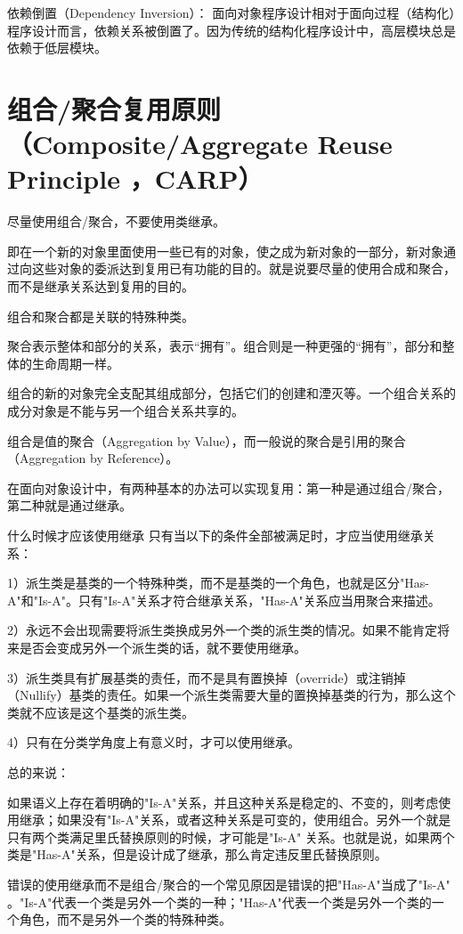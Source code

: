 依赖倒置（Dependency Inversion）：
面向对象程序设计相对于面向过程（结构化）程序设计而言，依赖关系被倒置了。因为传统的结构化程序设计中，高层模块总是依赖于低层模块。

\section{组合/聚合复用原则（Composite/Aggregate Reuse Principle ，CARP）}
尽量使用组合/聚合，不要使用类继承。

即在一个新的对象里面使用一些已有的对象，使之成为新对象的一部分，新对象通过向这些对象的委派达到复用已有功能的目的。就是说要尽量的使用合成和聚合，而不是继承关系达到复用的目的。

组合和聚合都是关联的特殊种类。

聚合表示整体和部分的关系，表示“拥有”。组合则是一种更强的“拥有”，部分和整体的生命周期一样。

组合的新的对象完全支配其组成部分，包括它们的创建和湮灭等。一个组合关系的成分对象是不能与另一个组合关系共享的。

组合是值的聚合（Aggregation by Value），而一般说的聚合是引用的聚合（Aggregation by Reference）。

在面向对象设计中，有两种基本的办法可以实现复用：第一种是通过组合/聚合，第二种就是通过继承。

什么时候才应该使用继承
只有当以下的条件全部被满足时，才应当使用继承关系：

1）派生类是基类的一个特殊种类，而不是基类的一个角色，也就是区分"Has-A"和"Is-A"。只有"Is-A"关系才符合继承关系，"Has-A"关系应当用聚合来描述。

2）永远不会出现需要将派生类换成另外一个类的派生类的情况。如果不能肯定将来是否会变成另外一个派生类的话，就不要使用继承。

3）派生类具有扩展基类的责任，而不是具有置换掉（override）或注销掉（Nullify）基类的责任。如果一个派生类需要大量的置换掉基类的行为，那么这个类就不应该是这个基类的派生类。

4）只有在分类学角度上有意义时，才可以使用继承。

总的来说：

如果语义上存在着明确的"Is-A"关系，并且这种关系是稳定的、不变的，则考虑使用继承；如果没有"Is-A"关系，或者这种关系是可变的，使用组合。另外一个就是只有两个类满足里氏替换原则的时候，才可能是"Is-A" 关系。也就是说，如果两个类是"Has-A"关系，但是设计成了继承，那么肯定违反里氏替换原则。

错误的使用继承而不是组合/聚合的一个常见原因是错误的把"Has-A"当成了"Is-A" 。"Is-A"代表一个类是另外一个类的一种；"Has-A"代表一个类是另外一个类的一个角色，而不是另外一个类的特殊种类。
